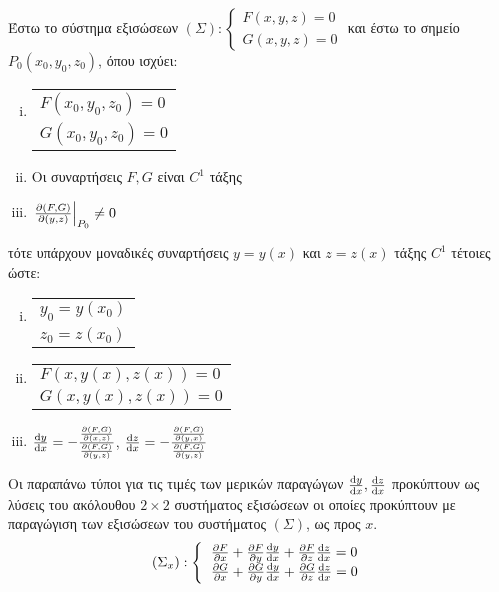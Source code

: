 Έστω το σύστημα εξισώσεων $(\Sigma):
	\begin{cases}
		F(x,y,z) = 0  \\
		G(x,y,z) = 0
	\end{cases}$
	και έστω το σημείο $ P_0(x_0,y_0,z_0) $, όπου ισχύει:
	\begin{enumerate}[(i)]
		\item  \begin{tabular}{l}
				$F(x_0,y_0,z_0) = 0$ \\
				$G(x_0,y_0,z_0) = 0$
			\end{tabular}
		\item Οι συναρτήσεις $ F, G $ είναι $ C^{1} $ τάξης 
		\item $ \left.\pdv{(F,G)}{(y,z)}\right|_{P_0} \neq 0 $ 
	\end{enumerate}
	τότε υπάρχουν μοναδικές συναρτήσεις $ y = y(x) $ και $ z = z(x) $ τάξης $ C^{1} $ τέτοιες
	ώστε:
	\begin{enumerate}[(i)]
		\item \begin{tabular}{l}
				$ y_0 = y(x_0) $ \\
				$ z_0 = z(x_0) $
			\end{tabular}
		\item \begin{tabular}{l}
				$ F(x,y(x),z(x)) = 0 $ \\
				$ G(x,y(x),z(x)) = 0 $
		\end{tabular}
	\item $ \dv{y}{x} = - \frac{\pdv{(F,G)}{(x,z)}}{\pdv{(F,G)}{(y,z)}} $, $ \dv{z}{x} = -
		\frac{\pdv{(F,G)}{(y,x)}}{\pdv{(F,G)}{(y,z)}} $
	\end{enumerate}

\begin{rem}
	Οι παραπάνω τύποι για τις τιμές των μερικών παραγώγων $ \dv{y}{x}, \dv{z}{x}$ προκύπτουν ως
	λύσεις του ακόλουθου $ 2 \times 2 $ συστήματος εξισώσεων οι οποίες προκύπτουν με παραγώγιση των
	εξισώσεων του συστήματος $ (\Sigma) $, ως προς $x$.
	\renewcommand{\arraystretch}{2}
	\[
	\begin{aligned}
		(\Sigma_x): \left\{\begin{tabular}{l}
	$\pdv{F}{x} + \pdv{F}{y}\dv{y}{x} + \pdv{F}{z}\dv{z}{x} = 0$ \\
	$\pdv{G}{x} + \pdv{G}{y}\dv{y}{x} + \pdv{G}{z}\dv{z}{x} = 0$
	\end{tabular}
	\right.
\end{aligned}
	\]
\end{rem}

